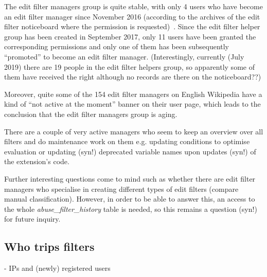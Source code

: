 The edit filter managers group is quite stable, with only 4 users who have become an edit filter manager since November 2016 (according to the archives of the edit filter noticeboard where the permission is requested)~\cite{Wikipedia:EditFilterNoticeboard}.
Since the edit filter helper group has been created in September 2017, only 11 users have been granted the corresponding permissions and only one of them has been subsequently ``promoted'' to become an edit filter manager.
(Interestingly, currently (July 2019) there are 19 people in the edit filter helpers group, so apparently some of them have received the right although no records are there on the noticeboard??)

Moreover, quite some of the 154 edit filter managers on English Wikipedia have a kind of ``not active at the moment'' banner on their user page, which leads to the conclusion that the edit filter managers group is aging.


There are a couple of very active managers who seem to keep an overview over all filters and do maintenance work on them e.g. updating conditions to optimise evaluation or updating (syn!) deprecated variable names upon updates (syn!) of the extension's code.

Further interesting questions come to mind such as whether there are edit filter managers who specialise in creating different types of edit filters (compare manual classification).
However, in order to be able to answer this, an access to the whole \emph{abuse\_filter\_history} table is needed, so this remains a question (syn!) for future inquiry.

\subsection{Who trips filters}

- IPs and (newly) registered users

